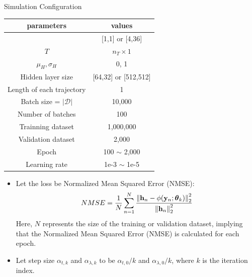 \documentclass[hyperref={bookmarks=false}]{beamer}
\numberwithin{figure}{section}
\begin{document}
\begin{frame}[allowframebreaks]{Simulation Configuration}

\begin{table}[h]
    \centering
    \renewcommand{\arraystretch}{1.1}
    \begin{tabular}{|c|c|}
        \hline
        parameters   &values \\
        \hline \hline
        [$n_R,n_T$]                     &[1,1] or [4,36]        \\ \hline
        $T$                             &$n_T \times 1$         \\ \hline
        $\mu_H, \sigma_H$               &0, 1          \\ \hline
        Hidden layer size               &[64,32] or [512,512]   \\ \hline
        Length of each trajectory       &1                      \\ \hline
        Batch size = $|\mathcal{D}|$    &10,000         \\ \hline
        Number of batches               &100            \\ \hline
        Trainning dataset               &1,000,000      \\ \hline
        Validation dataset              &2,000          \\ \hline
        Epoch                           &100 $\sim$ 2,000   \\ \hline
        Learning rate                   &1e-3 $\sim$ 1e-5  \\ \hline
    \end{tabular}
    \end{table}

\framebreak

\begin{itemize}
    \item Let the loss be Normalized Mean Squared Error (NMSE):
        $$NMSE=\frac{1}{N} \sum\limits_{n=1}^N
        \frac{\left\| {\bf h}_n-\phi(\mathbf{y}_n;\boldsymbol{\theta}_k) \right\|^2_2}
        {\left\| {\bf h}_n \right\|^2_2}$$
        Here, $N$ represents the size of the training or validation dataset, 
        implying that the Normalized Mean Squared Error (NMSE) is calculated for each epoch.
    \vspace{12pt}
    \item Let step size $\alpha_{t,k}$ and $\alpha_{\lambda,k}$ to be ${\alpha_{t,0}}/{k}$
        and ${\alpha_{\lambda,0}}/{k}$, where $k$ is the iteration index.
 
\end{itemize}
\end{frame}
\end{document}
